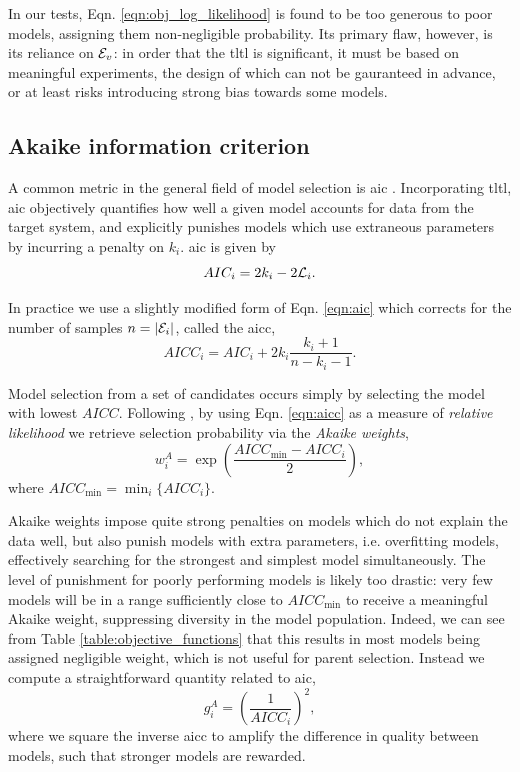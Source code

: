 In our tests, Eqn. \ref{eqn:obj_log_likelihood} is found to be too generous to poor models, 
    assigning them non-negligible probability. 
Its primary flaw, however, is its reliance on ${ \mathcal{E} }_v$: 
    in order that the \gls{tltl} is significant, it must be based on meaningful \glspl{experiment}, 
    the design of which can not be gauranteed in advance, or at least risks introducing strong bias
    towards some models. 

\subsection{Akaike information criterion}\label{sec:akaike_info_criterion}
A common metric in the general field of model selection is \gls{aic} \cite{dr2002model}.
Incorporating \gls{tltl}, 
    \gls{aic} objectively quantifies how well a given model accounts for data from the target system,
    and explicitly punishes models which use extraneous parameters by incurring a penalty on $k_i$. 
\gls{aic} is given by 
\begin{equation}
    \label{eqn:aic}
    AIC_i = 2k_i - 2 {\mathcal{L}}_{i}.
\end{equation}

In practice we use a slightly modified form of Eqn. \ref{eqn:aic} which
    corrects for the number of samples $n=\lvert{ \mathcal{E} }_i\rvert$, 
    called the \gls{aicc}, 
\begin{equation}
    \label{eqn:aicc}
    AICC_i = AIC_i + 2k_i \frac{k_i+1}{n-k_i-1}. 
\end{equation}

Model selection from a set of candidates occurs simply by selecting the model with lowest $AICC$.
Following \cite{dr2002model}, by using Eqn. \ref{eqn:aicc} as a measure of \emph{relative likelihood}
    we retrieve selection probability via
    the \emph{Akaike weights},
\begin{equation}
    \label{eqn:akaike_weights}
    w_i^A = \exp \left( \frac{{AICC_{\textrm{min}} - AICC_i}}{2} \right), 
\end{equation}
    where $AICC_{\textrm{min}} = \min_{i}\{ AICC_i\}$.

Akaike weights impose quite strong penalties 
    on models which do not explain the data well, 
    but also punish models with extra parameters, i.e. overfitting models, 
    effectively searching for the strongest and simplest model simultaneously.
The level of punishment for poorly performing models is likely too drastic: 
    very few models will be in a range sufficiently close to $AICC_{\textrm{min}}$ 
    to receive a meaningful Akaike weight, 
    suppressing diversity in the model population.
    Indeed, we can see from Table \ref{table:objective_functions} that this results in most 
    models being assigned negligible weight, which is not useful for parent selection. 
Instead we compute a straightforward quantity related to \gls{aic},
\begin{equation}
    \label{eqn:akaike_fitness}
    g_i^{A} = \left(\frac{1}{AICC_i}\right)^2,
\end{equation}
    where we square the inverse \gls{aicc} to amplify the difference in quality between models, 
    such that stronger models are rewarded.

